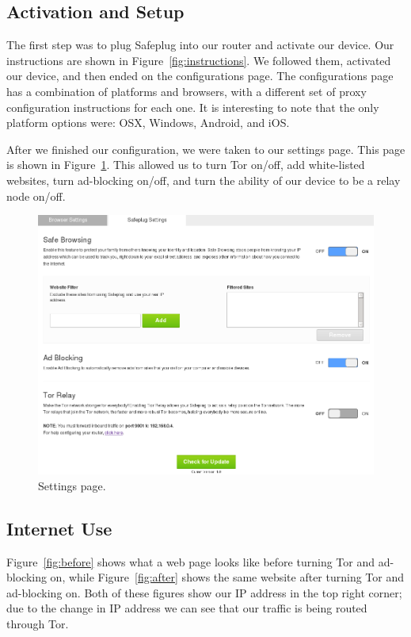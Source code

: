 \documentclass[conference]{IEEEtran}
\begin{document}
\subsection{Activation and Setup}
The first step was to plug Safeplug into our router and activate our device.  Our instructions are shown in Figure~\ref{fig:instructions}.  We followed them, activated our device, and then ended on the configurations page.  The configurations page has a combination of platforms and browsers, with a different set of proxy configuration instructions for each one.  It is interesting to note that the only platform options were: OSX, Windows, Android, and iOS.  


After we finished our configuration, we were taken to our settings page.  This page is shown in Figure~\ref{fig:settings}.  This allowed us to turn Tor on/off, add white-listed websites, turn ad-blocking on/off, and turn the ability of our device to be a relay node on/off.  

\begin{figure}[htb]
  \begin{center}
  \includegraphics[width=.4\textwidth]{settings}
  \caption{Settings page.}
  \label{fig:settings}
	\end{center}
\end{figure}

\subsection{Internet Use}
\label{inetuse}

Figure~\ref{fig:before} shows what a web page looks like before turning Tor and ad-blocking on, while Figure~\ref{fig:after} shows the same website after turning Tor and ad-blocking on.  Both of these figures show our IP address in the top right corner; due to the change in IP address we can see that our traffic is being routed through Tor.  
\end{document}
